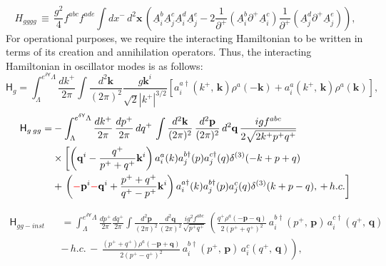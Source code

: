 \documentclass[aps,prd,amsmath,amssymb,nofootinbib]{revtex4-2}
\numberwithin{equation}{section}
\begin{document}
 \begin{equation}H_{gggg}\,\equiv\,\frac{g^{2}}{4}f^{abc}f^{ade}\int dx^{-}\, d^{2}\mathbf{x}\,\left(\underline{A}_{i}^{b}\underline{A}_{j}^{c}\underline{A}_{i}^{d}\underline{A}_{j}^{e}-2\frac{1}{\partial^{+}}(\underline{A}_{i}^{b}\partial^{+}\underline{A}_{i}^{c})\frac{1}{\partial^{+}}(\underline{A}_{j}^{d}\partial^{+}\underline{A}_{j}^{e})\right),
 \end{equation}
For operational purposes, we require the interacting Hamiltonian to be written in terms of its creation and annihilation operators. Thus, the interacting Hamiltonian in oscillator modes is as follows:
 \begin{equation}\label{eikohg}
\mathsf{H}_{g}=\int_{\Lambda}^{e^{\delta\mathsf{Y}}\Lambda}\frac{dk^{+}}{2\pi}\int\frac{d^{2}\mathbf{k}}{(2\pi)^{2}}\frac{g\mathbf{k}^{i}}{\sqrt{2}|k^{+}|^{3/2}}\left[a_{i}^{a\dagger}(k^{+},\, \mathbf{k})\rho^{a}(-\mathbf{k})+a_{i}^{a}(k^{+},\, \mathbf{k})\rho^{a}(\mathbf{k})\right],
 \end{equation}
 \begin{equation}\begin{split}
\mathsf{H}_{g\: gg}=&-\int_{\Lambda}^{e^{\delta\mathsf{Y}}\Lambda}\frac{dk^{+}}{2\pi}\,\frac{dp^{+}}{2\pi}\, dq^{+}\,\int\frac{d^{2}\mathbf{k}}{(2\pi)^{2}}\,\frac{d^{2}\mathbf{p}}{(2\pi)^{2}}\, d^{2}\mathbf{q}\,\frac{igf^{abc}}{2\sqrt{2k^{+}p^{+}q^{+}}}\\
&\times\left[\left(\mathbf{q}^{i}-\frac{q^{+}}{p^{+}+q^{+}}\mathbf{k}^{i}\right)a_{i}^{a}(k)a_{j}^{b\dagger}(p)a_{j}^{c\dagger}(q)\delta^{(3)}(-k+p+q)\right.\\
&+\left.\left({\color{red}-}\mathbf{p}^{i}{\color{red}-}\mathbf{q}^{i}+\frac{p^{+}+q^{+}}{q^{+}-p^{+}}\mathbf{k}^{i}\right)a_{i}^{a\dagger}(k)a_{j}^{b\dagger}(p)a_{j}^{c}(q)\delta^{(3)}(k+p-q),\,+\,h.c.\right]\\
 \end{split}\end{equation}

    \begin{eqnarray}
\mathsf{H}_{gg-inst}&&=\int_{\Lambda}^{e^{\delta\mathsf{Y}}\Lambda}\frac{dp^{+}}{2\pi}\frac{dq^{+}}{2\pi}\int\frac{d^{2}\mathbf{p}}{(2\pi)^{2}}\frac{d^{2}\mathbf{q}}{(2\pi)^{2}}\frac{ig^{2}f^{abc}}{\sqrt{p^{+}q^{+}}}\,\left(\frac{q^{+}\rho^{a}(-\mathbf{p}-\mathbf{q})}{2(p^{+}+q^{+})^{2}}\, a_{i}^{b\dagger}(p^{+},\,\mathbf{p})\, a_{i}^{c\dagger}(q^{+},\,\mathbf{q})\right.\nonumber\\
&&\left.-\, h.c.\,-\,\frac{(p^{+}+q^{+})\rho^{a}(-\mathbf{p}+\mathbf{q})}{2(p^{+}-q^{+})^{2}}\, a_{i}^{b\dagger}(p^{+},\,\mathbf{p})\, a_{i}^{c}(q^{+},\,\mathbf{q})\right),\end{eqnarray}
\end{document}
